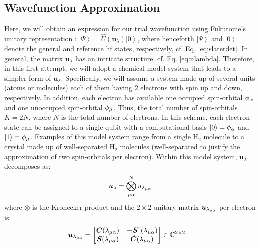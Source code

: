 \documentclass{aux/ttuthes2007}
\newcommand{\ket}[1]{\ensuremath{\left|#1\right\rangle}}
\newcommand{\elec}{N}
\newcommand{\orb}{K}
\newcommand{\uo}[1]{
		\IfEqCase{#1}{
			{0}{\mu}
			{1}{\nu}
			{2}{\xi}
		}[\PackageError{uo}{Undefined option to uo: #1}{}]
}
\newcommand{\oo}[1]{
		\IfEqCase{#1}{
			{0}{\alpha}
			{1}{\beta}
			{2}{\gamma}
		}[\PackageError{unocorb}{Undefined option to unuo: #1}{}]
}
\begin{document}
\subsection{\textbf{Wavefunction Approximation}}

Here, we will obtain an expression for our trial wavefunction using Fukutome’s unitary representation : 
$\ket \Psi = \hat U (\bm u_\lambda) \ket 0$,
where henceforth $\ket \Psi$ and $\ket 0$ denote the general and reference \gls{hf} states, respectively, cf. Eq. \ref{eq:slaterdet}.
In general, the matrix $\bm u_\lambda$ has an intricate structure, cf. Eq. \ref{eq:ulambda}.
Therefore, in this first attempt, we will adopt a chemical model system that leads to a simpler form of $\bm u_\lambda$.
Specifically, we will assume a system made up of several units (atoms or molecules) each of them having 2 electrons with spin up and down, respectively.
In addition, each electron has available one occupied spin-orbital $\phi_{\oo 0}$ and one unoccupied spin-orbital $\phi_{\uo 0}$.
Thus, the total number of spin-orbitals $\orb = 2\elec$, where $\elec$ is the total number of electrons.
In this scheme, each electron state can be assigned to a single qubit with a computational basis
$\ket 0 = \phi_{\oo 0}$ and $\ket 1 = \phi_{\uo 0}$.
Examples of this model system range from a single $\text{H}_2$ molecule to a crystal made up of well-separated $\text{H}_2$ molecules (well-separated to justify the approximation of two spin-orbitals per electron). 
Within this model system, $\bm u_\lambda$ decomposes as:
\begin{equation}
	\begin{split}
	\label {eq:udecomposition}
	\bm u_\lambda
	= \bigotimes_{\uo 0 \oo 0}^N u_{\lambda_{\uo 0 \oo 0}}
	\end{split}
\end{equation}
%
where $\otimes$ is the Kronecker product and the $2\times2$ unitary matrix $\bm u_{\lambda_{\uo 0 \oo 0}}$ per electron is:
%
\begin{align*}
	\bm u_{\lambda_{\uo 0 \oo 0}} 
	&= \begin{bmatrix}\bm C(\lambda_{\uo 0 \oo 0}) & \bm -\bm S^\dagger(\lambda_{\uo 0 \oo 0}) \\ \bm S(\lambda_{\uo 0 \oo 0}) & \tilde {\bm C}(\lambda_{\uo 0 \oo 0})\end{bmatrix} \in \mathbb{\bm C}^{2\times 2}
\end{align*}
\end{document}
